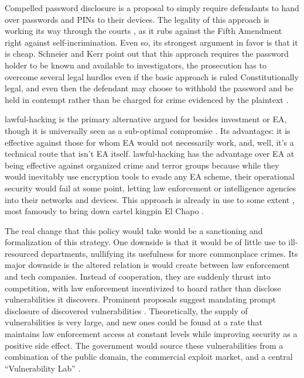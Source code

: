 Compelled password disclosure is a proposal to simply require defendants to hand over passwords and \acp{PIN} to their
devices. The legality of this approach is working its way through the courts \cite{bittenbender_2019} \cite{sobel_2019},
as it rubs against the Fifth Amendment right against self-incrimination. Even so, its strongest argument in favor is
that it is cheap. Schneier and Kerr point out that this approach requires the password holder to be known and available
to investigators, the prosecution has to overcome several legal hurdles even if the basic approach is ruled
Constitutionally legal, and even then the defendant may choose to withhold the password and be held in contempt rather
than be charged for crime evidenced by the plaintext \cite{kerr_encryption_2017}.

\Ac{lawful-hacking} is the primary alternative argued for besides investment or \ac{EA}, though it is universally seen
as a sub-optimal compromise \cite{bellovin_lawful_2013} \cite{hennessey_lawful_2016} \cite{rozenshtein_wicked_2018}
\cite{kerr_encryption_2017} \cite{soesanto_2018}. Its advantages: it is effective against those for whom \ac{EA} would
not necessarily work, and, well, it's a technical route that isn't \ac{EA} itself. \Ac{lawful-hacking} has the advantage
over \ac{EA} at being effective against organized crime and terror groups because while they would inevitably use
encryption tools to evade any \ac{EA} scheme, their operational security would fail at some point, letting law
enforcement or intelligence agencies into their networks and devices. This approach is already in use to some extent
\cite{cox_2020}, most famously to bring down cartel kingpin El Chapo \cite{feuer_chapo_2019}.

The real change that this policy would take would be a sanctioning and formalization of this strategy. One downside is
that it would be of little use to ill-resourced departments, nullifying its usefulness for more commonplace crimes. Its
major downside is the altered relation is would create between law enforcement and tech companies. Instead of
cooperation, they are suddenly thrust into competition, with law enforcement incentivized to hoard rather than disclose
vulnerabilities it discovers. Prominent proposals suggest mandating prompt disclosure of discovered vulnerabilities
\cite{bellovin_lawful_2013} \cite{hennessey_lawful_2016}. Theoretically, the supply of vulnerabilities is very large,
and new ones could be found at a rate that maintains law enforcement access at constant levels while improving security
as a positive side effect. The government would source these vulnerabilities from a combination of the public domain,
the commercial exploit market, and a central ``Vulnerability Lab'' \cite{bellovin_lawful_2013}.

